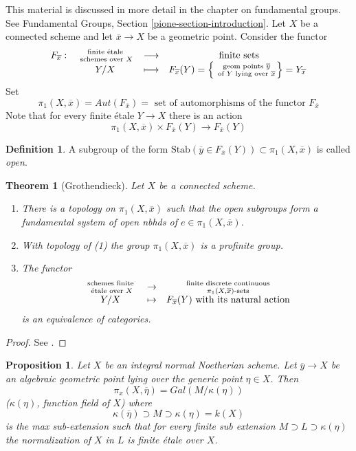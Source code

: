 \documentclass{stacks-project}
\theoremstyle{plain}
\newtheorem{theorem}[subsection]{Theorem}
\newtheorem{proposition}[subsection]{Proposition}
\theoremstyle{definition}
\newtheorem{definition}[subsection]{Definition}
\theoremstyle{remark}
\numberwithin{equation}{subsection}
\begin{document}
\noindent
This material is discussed in more detail in the chapter on
fundamental groups. See
Fundamental Groups, Section \ref{pione-section-introduction}.
Let $X$ be a connected scheme and let $\overline{x}\to X$ be a
geometric point. Consider the functor
$$
\begin{matrix}
F_{\overline{x}}: &
\text{ finite \'etale } \atop \text{ schemes over } X &
\longrightarrow & \text{ finite sets} \\
&
Y/X &
\longmapsto &
F_{\overline{x}}(Y) =
\left\{\text{ geom points }\overline y \atop \text{ of } Y
\text{ lying over }\overline{x}\right\} = Y_{\overline{x}}
\end{matrix}
$$
Set
$$
\pi_1(X, \overline{x})
=
Aut(F_{\overline{x}})
=
\text{ set of automorphisms of the functor }F_{\overline{x}}
$$
Note that for every finite \'etale $Y \to X$ there is an action
$$
\pi_1(X, \overline{x}) \times F_{\overline{x}}(Y) \to F_{\overline{x}}(Y)
$$

\begin{definition}
\label{definition-open}
A subgroup of the form
$\text{Stab}(\overline y\in F_{\overline{x}}(Y))\subset \pi_1(X, \overline{x})$
is called {\it open}.
\end{definition}

\begin{theorem}[Grothendieck]
\label{theorem-fundamental-group}
Let $X$ be a connected scheme.
\begin{enumerate}
\item There is a topology on $\pi_1(X, \overline{x})$ such that the open
subgroups form a fundamental system of open nbhds of $e\in \pi_1(X, \overline
x)$.
\item With topology of (1) the group
$\pi_1(X, \overline{x})$ is a profinite group.
\item The functor
$$
\begin{matrix}
\text{ schemes finite } \atop \text{ \'etale over }X & \to &
\text{ finite discrete continuous } \atop \pi_1(X, \overline{x})\text{-sets}\\
Y / X& \mapsto & F_{\overline{x}}(Y) \text{ with its natural action}
\end{matrix}
$$
is an equivalence of categories.
\end{enumerate}
\end{theorem}

\begin{proof}
See \cite{SGA1}.
\end{proof}

\begin{proposition}
\label{proposition-integral-normal-fundamental-group}
Let $X$ be an integral normal Noetherian scheme. Let
$\overline y\to X$ be an algebraic geometric point lying
over the generic point $\eta\in X$. Then
$$
\pi_x(X, \overline \eta) = Gal(M/\kappa(\eta))
$$
($\kappa(\eta)$, function field of $X$) where
$$
\kappa(\overline \eta)\supset M\supset \kappa(\eta) = k(X)
$$
is the max sub-extension such that for every finite sub extension
$M\supset L\supset \kappa(\eta)$ the normalization of $X$ in $L$ is finite
\'etale over $X$.
\end{proposition}
\end{document}
